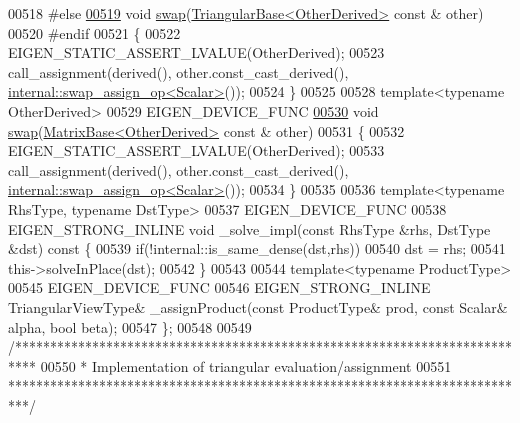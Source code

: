 \begin{DoxyCode}
00518 \textcolor{preprocessor}{#else}
\hyperlink{group___core___module_a154127e98e3b30d829220c61eb3c12b1}{00519}     \textcolor{keywordtype}{void} \hyperlink{group___core___module_a154127e98e3b30d829220c61eb3c12b1}{swap}(\hyperlink{group___core___module_class_eigen_1_1_triangular_base}{TriangularBase<OtherDerived>} \textcolor{keyword}{const} & other)
00520 \textcolor{preprocessor}{#endif}
00521     \{
00522       EIGEN\_STATIC\_ASSERT\_LVALUE(OtherDerived);
00523       call\_assignment(derived(), other.const\_cast\_derived(), 
      \hyperlink{struct_eigen_1_1internal_1_1swap__assign__op}{internal::swap\_assign\_op<Scalar>}());
00524     \}
00525 
00528     \textcolor{keyword}{template}<\textcolor{keyword}{typename} OtherDerived>
00529     EIGEN\_DEVICE\_FUNC
\hyperlink{group___core___module_a4723aa22f7e47d8d125079fe4f40f950}{00530}     \textcolor{keywordtype}{void} \hyperlink{group___core___module_a4723aa22f7e47d8d125079fe4f40f950}{swap}(\hyperlink{group___core___module_class_eigen_1_1_matrix_base}{MatrixBase<OtherDerived>} \textcolor{keyword}{const} & other)
00531     \{
00532       EIGEN\_STATIC\_ASSERT\_LVALUE(OtherDerived);
00533       call\_assignment(derived(), other.const\_cast\_derived(), 
      \hyperlink{struct_eigen_1_1internal_1_1swap__assign__op}{internal::swap\_assign\_op<Scalar>}());
00534     \}
00535 
00536     \textcolor{keyword}{template}<\textcolor{keyword}{typename} RhsType, \textcolor{keyword}{typename} DstType>
00537     EIGEN\_DEVICE\_FUNC
00538     EIGEN\_STRONG\_INLINE \textcolor{keywordtype}{void} \_solve\_impl(\textcolor{keyword}{const} RhsType &rhs, DstType &dst)\textcolor{keyword}{ const }\{
00539       \textcolor{keywordflow}{if}(!internal::is\_same\_dense(dst,rhs))
00540         dst = rhs;
00541       this->solveInPlace(dst);
00542     \}
00543 
00544     \textcolor{keyword}{template}<\textcolor{keyword}{typename} ProductType>
00545     EIGEN\_DEVICE\_FUNC
00546     EIGEN\_STRONG\_INLINE TriangularViewType& \_assignProduct(\textcolor{keyword}{const} ProductType& prod, \textcolor{keyword}{const} Scalar& alpha, \textcolor{keywordtype}{
      bool} beta);
00547 \};
00548 
00549 \textcolor{comment}{/***************************************************************************}
00550 \textcolor{comment}{* Implementation of triangular evaluation/assignment}
00551 \textcolor{comment}{***************************************************************************/}

\end{DoxyCode}

